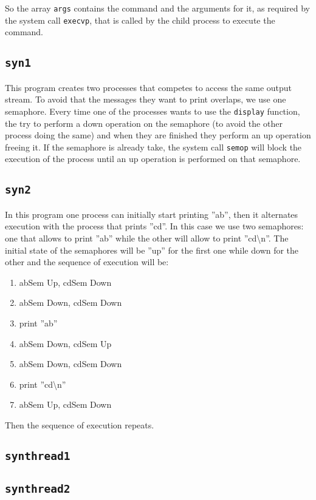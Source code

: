 So the array \texttt{args} contains the command and the arguments for it, as required by the system call \texttt{execvp}, that is called by the child process to execute the command.

\subsection{\texttt{syn1}}
This program creates two processes that competes to access the same output stream. To avoid that the messages they want to print overlaps, we use one semaphore. Every time one of the processes wants to use the \texttt{display} function, the try to perform a down operation on the semaphore (to avoid the other process doing the same) and when they are finished they perform an up operation freeing it. If the semaphore is already take, the system call \texttt{semop} will block the execution of the process until an up operation is performed on that semaphore.
\subsection{\texttt{syn2}}
In this program one process can initially start printing ''ab'', then it alternates execution with the process that prints ''cd''. In this case we use two semaphores: one that allows to print ''ab'' while the other will allow to print ''cd\textbackslash{}n''. The initial state of the semaphores will be ''up'' for the first one while down for the other and the sequence of execution will be:
\begin{enumerate}
\item abSem Up, cdSem Down
\item abSem Down, cdSem Down
\item print ''ab''
\item abSem Down, cdSem Up
\item abSem Down, cdSem Down
\item print ''cd\textbackslash{}n''
\item abSem Up, cdSem Down
\end{enumerate}
Then the sequence of execution repeats.

\subsection{\texttt{synthread1}}

\subsection{\texttt{synthread2}}

